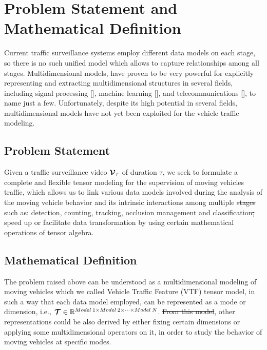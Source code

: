 \documentclass[sensors,article,submit,moreauthors,pdftex]{Definitions/mdpi}
\newcommand{\mathten}[1]{\boldsymbol{\mathbf{\mathcal{\MakeUppercase{#1}}}}}
\providecommand{\DIFadd}[1]{{\protect\color{blue}\uwave{#1}}} %
\providecommand{\DIFdel}[1]{{\protect\color{red}\sout{#1}}}                      %
\providecommand{\DIFaddbegin}{} %
\providecommand{\DIFaddend}{} %
\providecommand{\DIFdelbegin}{} %
\providecommand{\DIFdelend}{} %
\begin{document}
\section{Problem Statement and Mathematical Definition}

Current traffic surveillance systems employ different data models on each stage, so there is no such unified model which allows to capture relationships among all stages. Multidimensional models, have proven to be very powerful for explicitly representing and extracting multidimensional structures in several fields, including signal processing [], machine learning [],  and telecommunications [], to name just a few. Unfortunately, despite its high potential in several fields, multidimensional models have not yet been exploited for the vehicle traffic modeling.



\subsection{Problem Statement}
Given a traffic surveillance video $\mathten{V}_\tau$ of duration $\tau$, we seek to formulate a complete and flexible tensor modeling for the supervision of moving vehicles traffic, which allows us to link various data models involved during the analysis of the moving vehicle behavior and its intrinsic interactions among multiple \DIFdelbegin \DIFdel{stages }\DIFdelend \DIFaddbegin \DIFadd{tasks }\DIFaddend such as: \DIFaddbegin \DIFadd{vehicle }\DIFaddend detection, counting, tracking, occlusion management and classification\DIFdelbegin \DIFdel{; }\DIFdelend \DIFaddbegin \DIFadd{, as well as to }\DIFaddend speed up or facilitate data transformation by using certain mathematical operations of tensor algebra.



\subsection{Mathematical Definition}
The problem raised above can be understood as a multidimensional modeling of moving vehicles which we called Vehicle Traffic Feature (VTF) tensor model, in such a way that each data model employed, can be represented as a mode or dimension, i.e., $\mathten{T} \in \mathbb{R}^{Model\:1 \times Model\:2 \times \cdots \times Model\:N}$. \DIFdelbegin \DIFdel{From this model}\DIFdelend \DIFaddbegin \DIFadd{Moreover}\DIFaddend , other representations could be also derived by either fixing certain dimensions or applying some multidimensional operators on it, in order to study the behavior of moving vehicles at specific modes.
\end{document}
